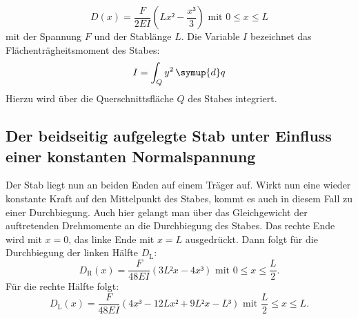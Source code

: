    \begin{equation}
     D(x) = \frac{F}{2EI}\left(Lx² - \frac{x³}{3}\right) \text{ mit }0 \leq x \leq L \label{eq:EinseitigEingespannt}
     \end{equation}
     mit der Spannung $F$ und der Stablänge $L$. Die Variable $I$ bezeichnet das
     Flächenträgheitsmoment des Stabes:
\begin{equation}
  I = \int_{Q}^{}y^2 \, \symup{d}q \label{eq:Flächenträgheitsmoment}
\end{equation}
Hierzu wird über die Querschnittsfläche $Q$ des Stabes integriert.

\subsection{Der beidseitig aufgelegte Stab unter Einfluss einer konstanten Normalspannung}
Der Stab liegt nun an beiden Enden auf einem Träger auf. Wirkt nun eine wieder
 konstante Kraft auf den Mittelpunkt des Stabes, kommt es auch in diesem Fall
  zu einer Durchbiegung.
 Auch hier gelangt man über das Gleichgewicht der auftretenden Drehmomente an die Durchbiegung des Stabes.
 Das rechte Ende wird mit $ x = 0$, das linke Ende mit $x= L$ ausgedrückt.
    Dann folgt für die Durchbiegung der linken Hälfte $D_\text{L}$:
  \begin{equation}
    D_\text{R}(x) = \frac{F}{48 EI}\left(3L²x-4x³\right) \text{ mit } 0 \leq x \leq \frac{L}{2}\text{.}\label{eq:BeidseitigAufgelegtRechts}
  \end{equation}
Für die rechte Hälfte folgt:
\begin{equation}
  D_\text{L}(x) = \frac{F}{48EI}\left(4x³ -12Lx² +9L²x-L³\right) \text{ mit } \frac{L}{2} \leq x \leq L\text{.}\label{eq:BeidseitigAufgelegtLinks}
\end{equation}
